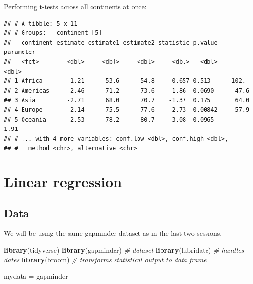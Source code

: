 \documentclass[]{book}
\makeatletter
\newenvironment{Shaded}{\begin{snugshade}}{\end{snugshade}}
\newcommand{\CommentTok}[1]{\textcolor[rgb]{0.56,0.35,0.01}{\textit{#1}}}
\newcommand{\DataTypeTok}[1]{\textcolor[rgb]{0.13,0.29,0.53}{#1}}
\newcommand{\DecValTok}[1]{\textcolor[rgb]{0.00,0.00,0.81}{#1}}
\newcommand{\KeywordTok}[1]{\textcolor[rgb]{0.13,0.29,0.53}{\textbf{#1}}}
\newcommand{\NormalTok}[1]{#1}
\newcommand{\OperatorTok}[1]{\textcolor[rgb]{0.81,0.36,0.00}{\textbf{#1}}}
\newcommand{\StringTok}[1]{\textcolor[rgb]{0.31,0.60,0.02}{#1}}
\newenvironment{kframe}{%
\medskip{}
\setlength{\fboxsep}{.8em}
 \def\at@end@of@kframe{}%
 \ifinner\ifhmode%
  \def\at@end@of@kframe{\end{minipage}}%
  \begin{minipage}{\columnwidth}%
 \fi\fi%
 \def\FrameCommand##1{\hskip\@totalleftmargin \hskip-\fboxsep
 \colorbox{shadecolor}{##1}\hskip-\fboxsep
     \hskip-\linewidth \hskip-\@totalleftmargin \hskip\columnwidth}%
 \MakeFramed {\advance\hsize-\width
   \@totalleftmargin\z@ \linewidth\hsize
   \@setminipage}}%
 {\par\unskip\endMakeFramed%
 \at@end@of@kframe}
\renewenvironment{Shaded}{\begin{kframe}}{\end{kframe}}
\theoremstyle{definition}
\theoremstyle{definition}
\theoremstyle{definition}
\theoremstyle{remark}
\makeatother
\begin{document}
Performing t-tests across all continents at once:

\begin{Shaded}
\end{Shaded}

\begin{verbatim}
## # A tibble: 5 x 11
## # Groups:   continent [5]
##   continent estimate estimate1 estimate2 statistic p.value parameter
##   <fct>        <dbl>     <dbl>     <dbl>     <dbl>   <dbl>     <dbl>
## 1 Africa       -1.21      53.6      54.8    -0.657 0.513      102.  
## 2 Americas     -2.46      71.2      73.6    -1.86  0.0690      47.6 
## 3 Asia         -2.71      68.0      70.7    -1.37  0.175       64.0 
## 4 Europe       -2.14      75.5      77.6    -2.73  0.00842     57.9 
## 5 Oceania      -2.53      78.2      80.7    -3.08  0.0965       1.91
## # ... with 4 more variables: conf.low <dbl>, conf.high <dbl>,
## #   method <chr>, alternative <chr>
\end{verbatim}

\hypertarget{linear-regression}{%
\chapter{Linear regression}\label{linear-regression}}

\hypertarget{data-3}{%
\section{Data}\label{data-3}}

We will be using the same gapminder dataset as in the last two sessions.

\begin{Shaded}
\begin{Highlighting}[]
\KeywordTok{library}\NormalTok{(tidyverse)}
\KeywordTok{library}\NormalTok{(gapminder) }\CommentTok{# dataset}
\KeywordTok{library}\NormalTok{(lubridate) }\CommentTok{# handles dates}
\KeywordTok{library}\NormalTok{(broom)     }\CommentTok{# transforms statistical output to data frame}

\NormalTok{mydata =}\StringTok{ }\NormalTok{gapminder}
\end{Highlighting}
\end{Shaded}
\end{document}
